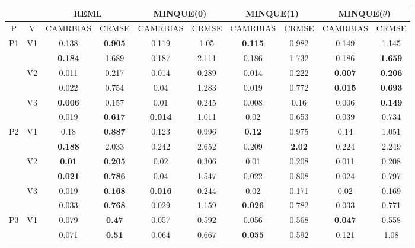 \documentclass[12pt,a4paper]{article}
\begin{document}
\begin{sidewaystable}[ht]
\centering
{\footnotesize
\begin{tabular}{cc|cc|cc|cc|cc|}
   & & \multicolumn{2}{c|}{REML}&\multicolumn{2}{c|}{MINQUE(0)}&\multicolumn{2}{c|}{MINQUE(1)}&\multicolumn{2}{c|}{MINQUE($\theta$)}\\ \hline
P & V & CAMRBIAS & CRMSE & CAMRBIAS & CRMSE & CAMRBIAS & CRMSE & CAMRBIAS & CRMSE \\ 
  \hline
\multirow{6}{*}{P1} & \multirow{2}{*}{V1} & 0.138 & \textbf{0.905} & 0.119 & 1.05 & \textbf{0.115} & 0.982 & 0.149 & 1.145 \\ 
   &  & \textbf{0.184} & 1.689 & 0.187 & 2.111 & 0.186 & 1.732 & 0.186 & \textbf{1.659} \\ 
   & \multirow{2}{*}{V2} & 0.011 & 0.217 & 0.014 & 0.289 & 0.014 & 0.222 & \textbf{0.007} & \textbf{0.206} \\ 
   &  & 0.022 & 0.754 & 0.04 & 1.283 & 0.019 & 0.772 & \textbf{0.015} & \textbf{0.693} \\ 
   & \multirow{2}{*}{V3} & \textbf{0.006} & 0.157 & 0.01 & 0.245 & 0.008 & 0.16 & 0.006 & \textbf{0.149} \\ 
   &  & 0.019 & \textbf{0.617} & \textbf{0.014} & 1.011 & 0.02 & 0.653 & 0.039 & 0.734 \\ 
   \hline \hline\multirow{6}{*}{P2} & \multirow{2}{*}{V1} & 0.18 & \textbf{0.887} & 0.123 & 0.996 & \textbf{0.12} & 0.975 & 0.14 & 1.051 \\ 
   &  & \textbf{0.188} & 2.033 & 0.242 & 2.652 & 0.209 & \textbf{2.02} & 0.224 & 2.249 \\ 
   & \multirow{2}{*}{V2} & \textbf{0.01} & \textbf{0.205} & 0.02 & 0.306 & 0.01 & 0.208 & 0.011 & 0.208 \\ 
   &  & \textbf{0.021} & \textbf{0.786} & 0.04 & 1.547 & 0.022 & 0.808 & 0.024 & 0.797 \\ 
   & \multirow{2}{*}{V3} & 0.019 & \textbf{0.168} & \textbf{0.016} & 0.244 & 0.02 & 0.171 & 0.02 & 0.169 \\ 
   &  & 0.033 & \textbf{0.768} & 0.029 & 1.159 & \textbf{0.026} & 0.782 & 0.033 & 0.771 \\ 
   \hline \hline\multirow{6}{*}{P3} & \multirow{2}{*}{V1} & 0.079 & \textbf{0.47} & 0.057 & 0.592 & 0.056 & 0.568 & \textbf{0.047} & 0.558 \\ 
   &  & 0.071 & \textbf{0.51} & 0.064 & 0.667 & \textbf{0.055} & 0.592 & 0.121 & 1.08 \\ 

\end{tabular}}
\end{sidewaystable}
\end{document}
